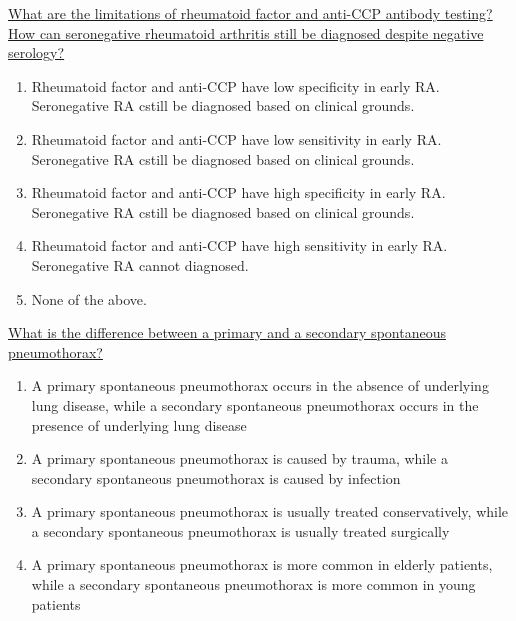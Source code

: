 \documentclass[10pt, a4paper]{article}
\begin{document}
\begin{enumerate}
 \vspace{12pt} 

\parbox{\linewidth}{\item \href{https://www.notion.so/Rheumatoid-Arthritis-6a0cf88ae3804bf28deb902f66fcfa47}{ What are the limitations of rheumatoid factor and anti-CCP antibody testing? How can seronegative rheumatoid arthritis still be diagnosed despite negative serology?} 
 \begin{enumerate}
 \item      Rheumatoid factor and anti-CCP have low specificity in early RA. Seronegative RA cstill be diagnosed based on clinical grounds.
 \item      Rheumatoid factor and anti-CCP have low sensitivity in early RA. Seronegative RA cstill be diagnosed based on clinical grounds.
 \item      Rheumatoid factor and anti-CCP have high specificity in early RA. Seronegative RA cstill be diagnosed based on clinical grounds.
 \item      Rheumatoid factor and anti-CCP have high sensitivity in early RA. Seronegative RA cannot diagnosed.
 \item      None of the above.
 \end{enumerate}} 

 \vspace{12pt} 

\parbox{\linewidth}{\item \href{https://www.notion.so/Diseases-of-the-Pleura-d3e3c9bbf58540aeb0c0f9260d62cb08}{ What is the difference between a primary and a secondary spontaneous pneumothorax?} 
 \begin{enumerate}
 \item A primary spontaneous pneumothorax occurs in the absence of underlying lung disease, while a secondary spontaneous pneumothorax occurs in the presence of underlying lung disease
 \item A primary spontaneous pneumothorax is caused by trauma, while a secondary spontaneous pneumothorax is caused by infection
 \item A primary spontaneous pneumothorax is usually treated conservatively, while a secondary spontaneous pneumothorax is usually treated surgically
 \item A primary spontaneous pneumothorax is more common in elderly patients, while a secondary spontaneous pneumothorax is more common in young patients
 \end{enumerate}} 


\end{enumerate}
\end{document}
